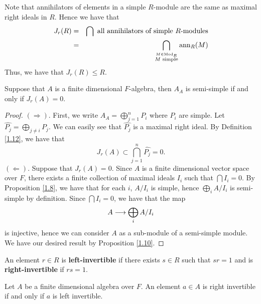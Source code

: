 \begin{remark}\label{1.13}
Note that annihilators of elements in a simple $R$-module are the same as maximal right ideals in $R$. Hence we have that 
\begin{eqnarray*}
J_r(R) & = & \bigcap	\text{ all annihilators of simple $R$-modules} \\
& = & \bigcap_{\overset{M\in \operatorname{Mod}_R}{M \text{ simple}}} \operatorname{ann}_R(M)
\end{eqnarray*}
Thus, we have that $J_r(R) \leq R.$
\end{remark}


\begin{lemma}\label{1.14}
Suppose that $A$ is a finite dimensional $F$-algebra, then $A_A$ is semi-simple if and only if $J_r(A) = 0$.
\end{lemma}
\begin{proof}
$(\Rightarrow).$ First, we write $A_A = \bigoplus_{j=1}^n P_i$ where $P_i$ are simple. Let $\widehat{P_j} = \bigoplus_{j\neq i}P_j$. We can easily see that $\widehat{P_j}$ is a maximal right ideal. By Definition \ref{1.12}, we have that 
$$J_r(A) \subset \bigcap_{j=1}^n \widehat{P_j} = 0.$$
$(\Leftarrow).$ Suppose that $J_r(A) = 0$. Since $A$ is a finite dimensional vector space over $F$, there exists a finite collection of maximal ideals $I_i$ such that $\bigcap I_i = 0$. By Proposition \ref{1.8}, we have that for each $i$, $A/I_i$ is simple, hence $\bigoplus_i A/I_i$ is semi-simple by definition. Since $\bigcap I_i = 0$, we have that the map 
$$A \longrightarrow \bigoplus_i A/I_i$$ 
is injective, hence we can consider $A$ as a sub-module of a semi-simple module. We have our desired result by Proposition \ref{1.10}.
\end{proof}

\begin{defn}\label{1.15}
An element $r \in R$ is \textbf{left-invertible} if there exists $s \in R$ such that $sr = 1$ and is \textbf{right-invertible} if $rs = 1$.
\end{defn}

\begin{lemma}\label{1.16}
Let $A$ be a finite dimensional algebra over $F$. An element $a \in A$ is right invertible if and only if $a$ is left invertible.
\end{lemma}

